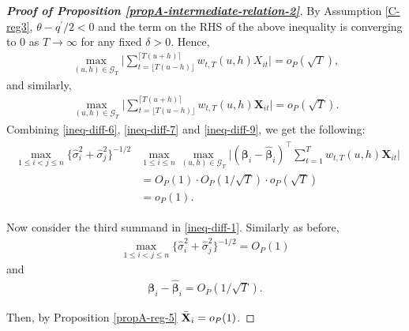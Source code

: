 \documentclass[a4paper,12pt]{article}
\begin{document}
\begin{proof}[\textnormal{\textbf{Proof of Proposition \ref{propA-intermediate-relation-2}}}]
By Assumption \ref{C-reg3}, $\theta - q^\prime/2 <0$ and the term on the RHS of the above inequality is converging to $0$ as $T \to \infty$ for any fixed $\delta >0$. Hence, 
\begin{align*}
\max_{(u, h) \in \mathcal{G}_T} \bigg| \sum_{t=\lfloor T(u-h) \rfloor}^{\lceil T(u+h) \rceil} w_{t,T}(u,h)X_{it}  \bigg| = o_P(\sqrt{T}),
\end{align*}
and similarly,
\begin{align}\label{ineq-diff-9}
\max_{(u, h) \in \mathcal{G}_T} \bigg| \sum_{t=\lfloor T(u-h) \rfloor}^{\lceil T(u+h) \rceil} w_{t,T}(u,h)\mathbf{X}_{it}  \bigg| = o_P(\sqrt{T}).
\end{align}
Combining \eqref{ineq-diff-6}, \eqref{ineq-diff-7} and \eqref{ineq-diff-9}, we get the following:
\begin{align}\label{ineq-diff-10}
\begin{split}
\max_{1\le i < j \le n} \{\widehat{\sigma}_i^2+ \widehat{\sigma}_j^2 \}^{-1/2}&\max_{1\le i \le n} \max_{(u,h) \in \mathcal{G}_T} \Big| (\bm{\beta}_i - \widehat{\bm{\beta}}_i)^\top\sum_{t=1}^T w_{t,T}(u,h) \mathbf{X}_{it} \Big|  \\
&=O_P(1) \cdot O_P(1/\sqrt{T}) \cdot o_P(\sqrt{T}) \\
&= o_P(1).
\end{split}
\end{align}


Now consider the third summand in \eqref{ineq-diff-1}. Similarly as before, 
\begin{align}\label{ineq-diff-11}
\max_{1\le i < j \le n}\{\widehat{\sigma}_i^2+ \widehat{\sigma}_j^2 \}^{-1/2}  = O_P(1)
\end{align}
and
\begin{align}\label{ineq-diff-12}
\bm{\beta}_i - \widehat{\bm{\beta}}_i = O_P(1/\sqrt{T}).
\end{align}

Then, by Proposition \ref{propA-reg-5} $\bar{\mathbf{X}}_i = o_P(1)$.


\end{proof}
\end{document}
